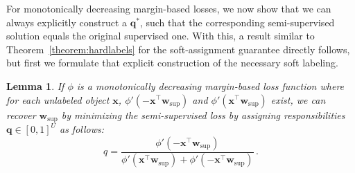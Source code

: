 \documentclass[twoside]{memoir}\usepackage[]{graphicx}\usepackage{xcolor}
\newtheorem{lemma}{Lemma}
\begin{document}
For monotonically decreasing margin-based losses, we now show that we can always explicitly construct a $\mathbf{q}^\ast$, such that the corresponding semi-supervised solution equals the original supervised one.  With this, a result similar to Theorem~\ref{theorem:hardlabels} for the soft-assignment guarantee directly follows, but first we formulate that explicit construction of the necessary soft labeling.
\begin{lemma}\label{lemma:responsibilities}
If $\phi$ is a monotonically decreasing margin-based loss function where for each unlabeled object $\mathbf{x}$, $\phi'(-\mathbf{x}^\top \mathbf{w}_\mathrm{sup})$ and $\phi'(\mathbf{x}^\top \mathbf{w}_\mathrm{sup})$ exist, we can recover $\mathbf{w}_\mathrm{sup}$ by minimizing the semi-supervised loss by assigning  responsibilities $\mathbf{q} \in [0,1]^U$ as follows:
\begin{equation}\label{eq:solutionq}
q = \frac{\phi'(-\mathbf{x}^\top \mathbf{w}_\mathrm{sup})}{\phi'(\mathbf{x}^\top \mathbf{w}_\mathrm{sup}) + \phi'(-\mathbf{x}^\top \mathbf{w}_\mathrm{sup})}\,.
\end{equation}
\end{lemma}
\end{document}
